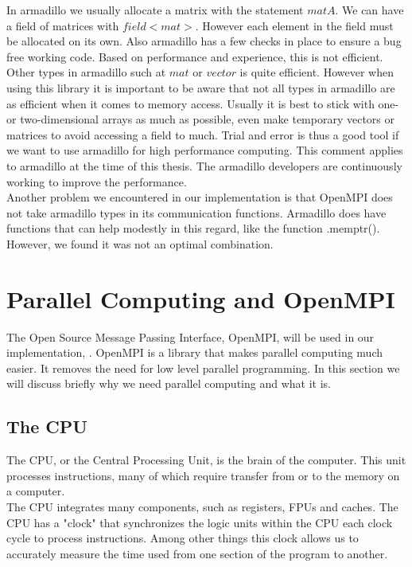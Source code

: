 \documentclass[a4paper,norsk,11pt,twoside]{report}
\begin{document}
In armadillo we usually allocate a matrix with the statement $mat A$. We can have
a field of matrices with $field<mat>$. However each element in the field
must be allocated on its own. Also armadillo has a few checks in place
to ensure a bug free working code. Based on performance and
experience, this is not efficient. \\

Other types in armadillo such at $mat$ or $vector$ is quite
efficient. However when using this library it is important to be aware
that not all types in armadillo are as efficient when it comes to
memory access. Usually it is best to stick with one- or two-dimensional
arrays as much as possible, even make temporary vectors or matrices to
avoid accessing a field to much. Trial and error is thus a good tool
if we want to use armadillo for high performance computing. This
comment applies to armadillo at the time of this thesis. The armadillo
developers are continuously working to improve the performance. \\

Another problem we encountered in our implementation is that OpenMPI
does not take armadillo types in its communication
functions. Armadillo does have functions that can help modestly in
this regard, like the function .memptr(). However, we found it was not
an optimal combination.

\section{Parallel Computing and OpenMPI}
The Open Source Message Passing Interface, OpenMPI, will be used in
our implementation, \cite{openmpi_cite}. OpenMPI is a library that
makes parallel computing much easier. It removes the need for low
level parallel programming. In this section we will discuss briefly
why we need parallel computing and what it is.

\subsection{The CPU \label{the_cpu_section}}
The CPU, or the Central Processing Unit, is the brain of the
computer. This unit processes instructions, many of which require
transfer from or to the memory on a computer. \\

The CPU integrates many components, such as registers, FPUs and
caches. The CPU has a "clock" that synchronizes the logic units within
the CPU each clock cycle to process instructions. Among other things
this clock allows us to accurately measure the time used from one
section of the program to another. \\
\end{document}
